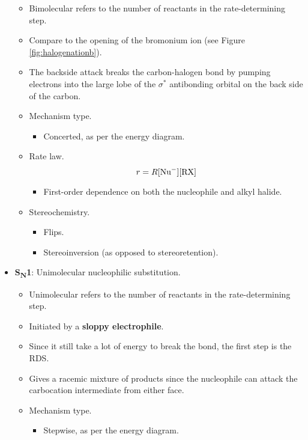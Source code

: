\documentclass[../notes.tex]{subfiles}
\begin{document}
\begin{itemize}
\begin{itemize}
        \item Bimolecular refers to the number of reactants in the rate-determining step.
        \item Compare to the opening of the bromonium ion (see Figure \ref{fig:halogenationb}).
        \item The backside attack breaks the carbon-halogen bond by pumping electrons into the large lobe of the $\sigma^*$ antibonding orbital on the back side of the carbon.
        \item Mechanism type.
        \begin{itemize}
            \item Concerted, as per the energy diagram.
        \end{itemize}
        \item Rate law.
        \begin{equation*}
            r = R[\ce{Nu-}][\ce{RX}]
        \end{equation*}
        \begin{itemize}
            \item First-order dependence on both the nucleophile and alkyl halide.
        \end{itemize}
        \item Stereochemistry.
        \begin{itemize}
            \item Flips.
            \item Stereoinversion (as opposed to stereoretention).
        \end{itemize}
    \end{itemize}
    \item \textbf{S\textsubscript{N}1}: Unimolecular nucleophilic substitution.
    \begin{itemize}
        \item Unimolecular refers to the number of reactants in the rate-determining step.
        \item Initiated by a \textbf{sloppy electrophile}.
        \item Since it still take a lot of energy to break the  bond, the first step is the RDS.
        \item Gives a racemic mixture of products since the nucleophile can attack the carbocation intermediate from either face.
        \item Mechanism type.
        \begin{itemize}
            \item Stepwise, as per the energy diagram.

\end{itemize}
\end{itemize}
\end{itemize}
\end{document}
